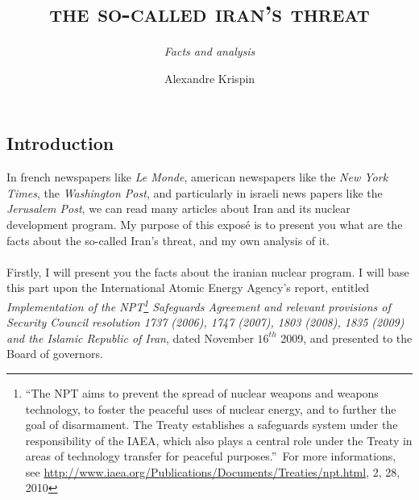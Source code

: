 \documentclass[
paper=a4,
fontsize=10pt,
headsepline,
headings=normal,
version=last,
footinclude=true,
mpinclude=true,
fleqn
]{scrartcl}
\begin{document}

\begin{titlepage}
    
    \title{
\rmfamily
\mdseries
\lowercase{
\scshape{
\textcolor{spot}{
The so-called Iran's threat%
}}}}

    \subtitle{
\rmfamily
\mdseries
\itshape
\normalsize{
Facts and analysis%
}}
\author{Alexandre Krispin} %

\end{titlepage}
\maketitle
\tableofcontents

\textcolor{spot}{\section{Introduction}}

In french newspapers like \emph{Le Monde}, american newspapers like the \emph{New York Times}, the \emph{Washington Post}, and particularly in israeli news papers like the \emph{Jerusalem Post}, we can read many articles about Iran and its nuclear development program. My purpose of this exposé is to present you what are the facts about the so-called Iran's threat, and my own analysis of it.
\paragraph{}
Firstly, I will present you the facts about the iranian nuclear program. I will base this part upon the International Atomic Energy Agency's report, entitled \emph{Implementation of the NPT\footnote{\textquotedblleft The NPT aims to prevent the spread of nuclear weapons and weapons technology, to foster the peaceful uses of nuclear energy, and to further the goal of disarmament. The Treaty establishes a safeguards system under the responsibility of the IAEA, which also plays a central role under the Treaty in areas of technology transfer for peaceful purposes.\textquotedblright~For more informations, see \url{http://www.iaea.org/Publications/Documents/Treaties/npt.html}, 2, 28, 2010} Safeguards Agreement and relevant provisions of Security Council resolution 1737 (2006), 1747 (2007), 1803 (2008), 1835 (2009) and the Islamic Republic of Iran}, dated November $16^{th}$ 2009, and presented to the Board of governors.
\end{document}
